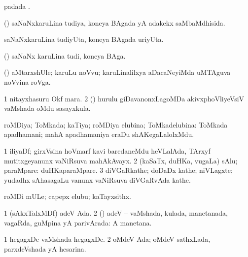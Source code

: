 \bentry
{}
\gl{\nA}
\bmng
{} padada \bava. 
\emng
\eentry

\bentry
{}
\gl{\gu}
\bmng
(\aMrashA) saNaNxkaruLina tudiya, koneya BAgada yA adakekx saMbaMdhisida. 
\emng
\eentry

\bentry
{}
\gl{\nA}
\bmng
saNaNxkaruLina tudiyUta, koneya BAgada uriyUta. 
\emng
\eentry

\bentry
{}
\gl{\nA}
\bmng
(\aMrashA) saNaNx karuLina tudi, koneya BAga. 
\emng
\eentry

\bentry
{}
\gl{\nA}
\bmng
(\roVshA) aMtarxshUle; karuLu noVvu; karuLinalilxya aDacaNeyiMda uMTAguva noVvina roVga. 
\emng
\eentry

\bentry
{}
\gl{\nA}
\bmng
\bnum
\num{1} nitayxhasuru Okf mara. 
\num{2} (\savi) hurulu giDavanonxLagoMDa akivxphoVliyeVsiV vaMshada oMdu sasayxkula. 
\enum
\emng
\eentry

\bentry
{}
\gl{\gu}
\bmng
roMDiya; ToMkada; kaTiya; roMDiya elubina; ToMkadelubina:  ToMkada apadhamani; mahA apadhamaniya eraDu shAKegaLalolxMdu. 
\emng
\eentry

\bentry
{}
\gl{\nA}
\bmng
\bnum
\num{1} iliyaDf; girxVsina hoVmarf kavi baredaneMdu heVLalAda, TArxyf mutitxgeyanunx vaNiRsuva mahAkAvayx. 
\num{2} (kaSaTx, duHKa, \mo vugaLa) sAlu; paraMpare:  duHKaparaMpare. 
\num{3} diVGaRkathe; doDaDx kathe; niVLagxte; yudadhx sAhasagaLu \mo vanunx vaNiRsuva diVGaRvAda kathe. 
\enum
\emng
\eentry

\bentry
{}
\gl{\nA}
\bmng
 roMDi mULe; capepx elubu; kaTayxsithx. 
\emng
\eentry

\bentry
{}
\gl{\gu}
\bmng
\bnum
\num{1} (sAkxTalxMDf) adeV Ada. 
\num{2} (\AmA) adeV -- vaMshada, kulada, manetanada, vagaRda, guMpina yA parivArada:  A manetana. 
\enum
\emng

\noindent
\gl{\pagu}
\bmng
\bnum
\num{1}  hegagxDe vaMshada hegagxDe. 
\num{2}  oMdeV Ada; oMdeV sathxLada, parxdeVshada yA hesarina. 
\enum
\emng
\eentry

